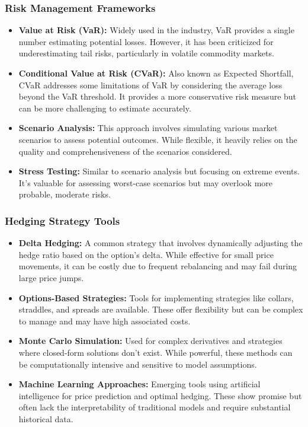 \documentclass[12pt]{article}
\begin{document}
\subsubsection{Risk Management Frameworks}
\begin{itemize}
\item \textbf{Value at Risk (VaR):} Widely used in the industry, VaR provides a single number estimating potential losses. However, it has been criticized for underestimating tail risks, particularly in volatile commodity markets.
\item \textbf{Conditional Value at Risk (CVaR):} Also known as Expected Shortfall, CVaR addresses some limitations of VaR by considering the average loss beyond the VaR threshold. It provides a more conservative risk measure but can be more challenging to estimate accurately.

\item \textbf{Scenario Analysis:} This approach involves simulating various market scenarios to assess potential outcomes. While flexible, it heavily relies on the quality and comprehensiveness of the scenarios considered.

\item \textbf{Stress Testing:} Similar to scenario analysis but focusing on extreme events. It's valuable for assessing worst-case scenarios but may overlook more probable, moderate risks.
\end{itemize}
\subsubsection{Hedging Strategy Tools}
\begin{itemize}
\item \textbf{Delta Hedging:} A common strategy that involves dynamically adjusting the hedge ratio based on the option's delta. While effective for small price movements, it can be costly due to frequent rebalancing and may fail during large price jumps.
\item \textbf{Options-Based Strategies:} Tools for implementing strategies like collars, straddles, and spreads are available. These offer flexibility but can be complex to manage and may have high associated costs.

\item \textbf{Monte Carlo Simulation:} Used for complex derivatives and strategies where closed-form solutions don't exist. While powerful, these methods can be computationally intensive and sensitive to model assumptions.

\item \textbf{Machine Learning Approaches:} Emerging tools using artificial intelligence for price prediction and optimal hedging. These show promise but often lack the interpretability of traditional models and require substantial historical data.
\end{itemize}
\end{document}

